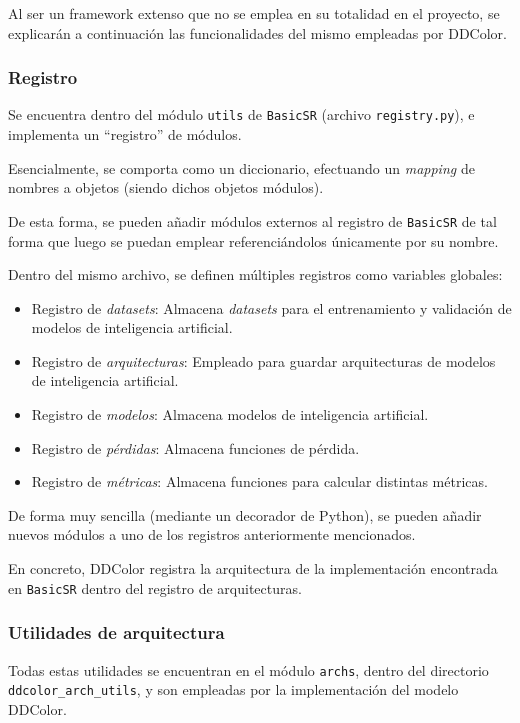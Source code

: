 \documentclass[a4paper]{article}
\begin{document}
Al ser un framework extenso que no se emplea en su totalidad en el proyecto, se explicarán a continuación las funcionalidades del mismo empleadas por DDColor.

\subsubsection{Registro}

Se encuentra dentro del módulo \texttt{utils} de \texttt{BasicSR} (archivo \texttt{registry.py}), e implementa un ``registro'' de módulos.

Esencialmente, se comporta como un diccionario, efectuando un \textit{mapping} de nombres a objetos (siendo dichos objetos módulos).

De esta forma, se pueden añadir módulos externos al registro de \texttt{BasicSR} de tal forma que luego se puedan emplear referenciándolos únicamente por su nombre.

Dentro del mismo archivo, se definen múltiples registros como variables globales:

\begin{itemize}
  \item{Registro de \textit{datasets}: Almacena \textit{datasets} para el entrenamiento y validación de modelos de inteligencia artificial.}
  \item{Registro de \textit{arquitecturas}: Empleado para guardar arquitecturas de modelos de inteligencia artificial.}
  \item{Registro de \textit{modelos}: Almacena modelos de inteligencia artificial.}
  \item{Registro de \textit{pérdidas}: Almacena funciones de pérdida.}
  \item{Registro de \textit{métricas}: Almacena funciones para calcular distintas métricas.}
\end{itemize}

De forma muy sencilla (mediante un decorador de Python), se pueden añadir nuevos módulos a uno de los registros anteriormente mencionados.

En concreto, DDColor registra la arquitectura de la implementación encontrada en \texttt{BasicSR} dentro del registro de arquitecturas.

\subsubsection{Utilidades de arquitectura}

Todas estas utilidades se encuentran en el módulo \texttt{archs}, dentro del directorio \texttt{ddcolor\_arch\_utils}, y son empleadas por la implementación del modelo DDColor.
\end{document}
